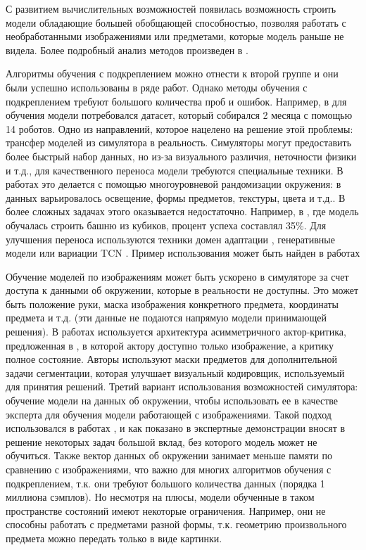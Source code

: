 \documentclass{mipt-thesis-bs}
\begin{document}
С развитием вычислительных возможностей появилась возможность строить модели обладающие большей обобщающей способностью, позволяя работать с необработанными изображениями или предметами, которые модель раньше не видела. Более подробный анализ методов произведен в \cite{survey}.

Алгоритмы обучения с подкреплением можно отнести к второй группе и они были успешно использованы в ряде работ. Однако методы обучения с подкреплением требуют большого количества проб и ошибок. Например, в \cite{levine} для обучения модели потребовался датасет, который собирался 2 месяца с помощью 14 роботов. Одно из направлений, которое нацелено на решение этой проблемы: трансфер моделей из симулятора в реальность. 
Симуляторы могут предоставить более быстрый набор данных, но из-за визуального различия, неточности физики и т.д., для качественного переноса модели требуются специальные техники. В работах \cite{abbel, james1, james2} это делается с помощью многоуровневой рандомизации окружения: в данных варьировалось освещение, формы предметов, текстуры, цвета и т.д.. В более сложных задачах этого оказывается недостаточно. Например, в \cite{0.35}, где модель обучалась строить башню из кубиков, процент успеха составлял 35\%. Для улучшения переноса используются техники домен адаптации \cite{dann}, генеративные модели \cite{gann} или вариации TCN \cite{tcn}. Пример использования может быть найден в работах \cite{danngann, jamesgann,  aytar} 

Обучение моделей по изображениям может быть ускорено в симуляторе за счет доступа к данными об окружении, которые в реальности не доступны. Это может быть положение руки, маска изображения конкретного предмета, координаты предмета и т.д. (эти данные не подаются напрямую модели принимающей решения). В работах \cite{james2, 0.35} используется архитектура асимметричного актор-критика, предложенная в \cite{assym-ac}, в которой актору доступно только изображение, а критику полное состояние. 
Авторы \cite{jamesgann} используют маски предметов для дополнительной задачи сегментации, которая улучшает визуальный кодировщик, используемый для принятия решений. 
Третий вариант использования возможностей симулятора: обучение модели на данных об окружении, чтобы использовать ее в качестве эксперта для обучения модели работающей с изображениями. Такой подход использовался в работах \cite{aytar, bcfeat}, и как показано в \cite{aytar, abbel2} экспертные демонстрации вносят в решение некоторых задач большой вклад, без которого модель может не обучиться.
Также вектор данных об окружении занимает меньше памяти по сравнению с изображениями, что важно для многих алгоритмов обучения с подкреплением, т.к. они требуют большого количества данных (порядка 1 миллиона сэмплов).
Но несмотря на плюсы, модели обученные в таком пространстве состояний имеют некоторые ограничения. Например, они не способны работать с предметами разной формы, т.к. геометрию произвольного предмета можно передать только в виде картинки.
\end{document}

